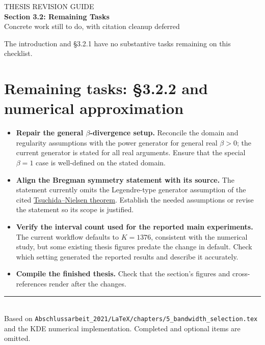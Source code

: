 \documentclass[11pt,a4paper]{article}
\newcommand{\todoitem}[1]{\item[$\square$] \textbf{#1}}
\newcommand{\heading}[1]{\section*{\color{ink}#1}}
\begin{document}
{\Large\color{accent} THESIS REVISION GUIDE}\\[0.3em]
{\LARGE\bfseries\color{ink} Section 3.2: Remaining Tasks}\\[0.5em]
{\large Concrete work still to do, with citation cleanup deferred}

The introduction and \S3.2.1 have no substantive tasks remaining on this checklist.

\heading{Remaining tasks: \S3.2.2 and numerical approximation}
\begin{itemize}
\todoitem{Repair the general $\beta$-divergence setup.} Reconcile the domain and regularity assumptions with the power generator for general real $\beta>0$; the current generator is stated for all real arguments. Ensure that the special $\beta=1$ case is well-defined on the stated domain.
\todoitem{Align the Bregman symmetry statement with its source.} The statement currently omits the Legendre-type generator assumption of the cited \href{https://arxiv.org/html/2604.24047}{Tsuchida--Nielsen theorem}. Establish the needed assumptions or revise the statement so its scope is justified.
\todoitem{Verify the interval count used for the reported main experiments.} The current workflow defaults to $K=1376$, consistent with the numerical study, but some existing thesis figures predate the change in default. Check which setting generated the reported results and describe it accurately.
\todoitem{Compile the finished thesis.} Check that the section's figures and cross-references render after the changes.
\end{itemize}

\vfill
\noindent\rule{\textwidth}{0.3pt}\\[-0.3em]
{\footnotesize\color{muted}Based on \texttt{Abschlussarbeit\_2021/LaTeX/chapters/5\_bandwidth\_selection.tex} and the KDE numerical implementation. Completed and optional items are omitted.}
\end{document}
